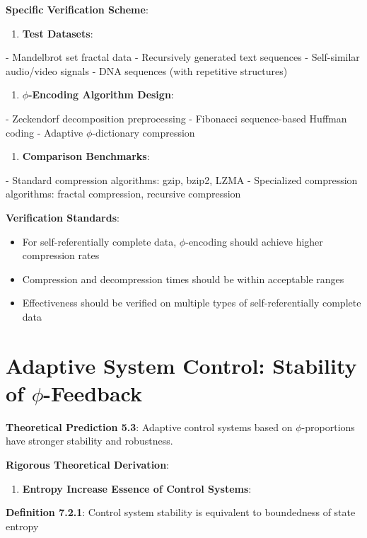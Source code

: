 \textbf{Specific Verification Scheme}:
\begin{enumerate}
\item \textbf{Test Datasets}:
\end{enumerate}
   - Mandelbrot set fractal data
   - Recursively generated text sequences
   - Self-similar audio/video signals
   - DNA sequences (with repetitive structures)

\begin{enumerate}
\item \textbf{$\phi$-Encoding Algorithm Design}:
\end{enumerate}
   - Zeckendorf decomposition preprocessing
   - Fibonacci sequence-based Huffman coding
   - Adaptive $\phi$-dictionary compression

\begin{enumerate}
\item \textbf{Comparison Benchmarks}:
\end{enumerate}
   - Standard compression algorithms: gzip, bzip2, LZMA
   - Specialized compression algorithms: fractal compression, recursive compression

\textbf{Verification Standards}:
\begin{itemize}
\item For self-referentially complete data, $\phi$-encoding should achieve higher compression rates
\item Compression and decompression times should be within acceptable ranges
\item Effectiveness should be verified on multiple types of self-referentially complete data
\end{itemize}

\section{Adaptive System Control: Stability of $\phi$-Feedback}
\label{sec:ch07_applications:adaptive-system-control-stability-of-phi-feedback}

\textbf{Theoretical Prediction 5.3}: Adaptive control systems based on $\phi$-proportions have stronger stability and robustness.

\textbf{Rigorous Theoretical Derivation}:

\begin{enumerate}
\item \textbf{Entropy Increase Essence of Control Systems}:
\end{enumerate}
   \textbf{Definition 7.2.1}: Control system stability is equivalent to boundedness of state entropy
\label{thm:5.3}
   
